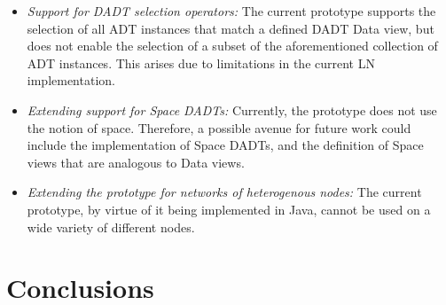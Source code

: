 \begin{itemize}
  \item \emph{Support for DADT selection operators:} The current prototype
  supports the selection of all ADT instances that match a defined DADT Data
  view, but does not enable the selection of a subset of the aforementioned
  collection of ADT instances. This arises due to limitations in the current LN implementation.
  \item \emph{Extending support for Space DADTs:} Currently, the prototype does
  not use the notion of space. Therefore, a possible avenue for future work
  could include the implementation of Space DADTs, and the definition of Space
  views that are analogous to Data views.
  \item \emph{Extending the prototype for networks of heterogenous nodes:}
  The current prototype, by virtue of it being implemented in Java, cannot be
  used on a wide variety of different nodes. 
\end{itemize}

\section{Conclusions}

